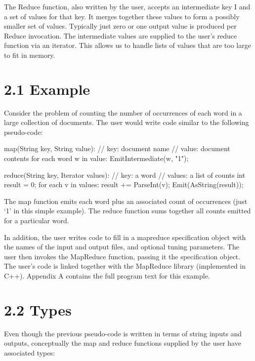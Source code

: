 \documentclass[
]{article}
\newenvironment{Shaded}{}{}
\newcommand{\NormalTok}[1]{#1}
\begin{document}
The Reduce function, also written by the user, accepts an intermediate
key I and a set of values for that key. It merges together these values
to form a possibly smaller set of values. Typically just zero or one
output value is produced per Reduce invocation. The intermediate values
are supplied to the user's reduce function via an iterator. This allows
us to handle lists of values that are too large to fit in memory.

\section{2.1 Example}\label{example}

Consider the problem of counting the number of occurrences of each word
in a large collection of documents. The user would write code similar to
the following pseudo-code:

\begin{Shaded}
\begin{Highlighting}[]
\NormalTok{map(String key, String value):}
\NormalTok{    // key: document name}
\NormalTok{    // value: document contents}
\NormalTok{    for each word w in value:}
\NormalTok{    EmitIntermediate(w, "1");}

\NormalTok{reduce(String key, Iterator values):}
\NormalTok{    // key: a word}
\NormalTok{    // values: a list of counts}
\NormalTok{    int result = 0;}
\NormalTok{    for each v in values:}
\NormalTok{    result += ParseInt(v);}
\NormalTok{    Emit(AsString(result)); }
\end{Highlighting}
\end{Shaded}

The map function emits each word plus an associated count of occurrences
(just `1' in this simple example). The reduce function sums together all
counts emitted for a particular word.

In addition, the user writes code to fill in a mapreduce specification
object with the names of the input and output files, and optional tuning
parameters. The user then invokes the MapReduce function, passing it the
specification object. The user's code is linked together with the
MapReduce library (implemented in C++). Appendix A contains the full
program text for this example.

\section{2.2 Types}\label{types}

Even though the previous pseudo-code is written in terms of string
inputs and outputs, conceptually the map and reduce functions supplied
by the user have associated types:
\end{document}
